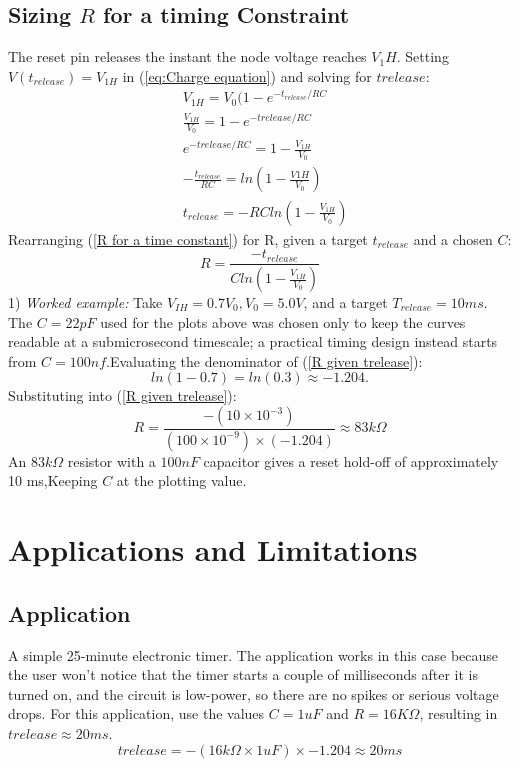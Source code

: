 \documentclass[conference]{IEEEtran}
\begin{document}
\subsection{Sizing $R$ for a timing Constraint}
The reset pin releases the instant the node voltage reaches $V_1H$. Setting $V(t_{release}) = V_{1H}$ in (\ref{eq:Charge equation}) and solving for $t{release}:$
\begin{equation}
    \begin{aligned}
        & V_{1H} = V_0 ( 1 - e^{-t_{release}/RC}\\
        &\frac{V_{1H}}{V_0} = 1 - e^{-trelease/RC}\\
        &e^{-trelease/RC} = 1 - \frac{V_{1H}}{V_0}\\
        &-\frac{t_{release}}{RC} = ln(1 - \frac{V{1H}}{V_0})\\
        &t_{release} = -RC ln(1- \frac{V_{1H}}{V_0})
    \end{aligned}
    \label{R for a time constant}
\end{equation}
Rearranging (\ref{R for a time constant}) for R, given a target $t_{release}$ and a chosen $C$:
\begin{equation}
    R = \frac{-t_{release}}{C ln(1 -\frac{V_{1H}}{V_0})}
    \label{R given trelease}
\end{equation}
1) \textit{Worked example:} Take $V_{IH} = 0.7 V_0, V_0 = 5.0 V$, and a target $T_{release} = 10ms$. The $C = 22 pF$ used for the plots above was chosen only to keep the curves readable at a submicrosecond timescale; a practical timing design instead starts from $C = 100nf$.Evaluating the denominator of (\ref{R given trelease}):
\begin{equation}
    ln(1-0.7) = ln(0.3) \approx -1.204.
\end{equation}
Substituting into (\ref{R given trelease}):
\begin{equation}
    R = \frac{-(10 \times 10^{-3})}{(100 \times 10^{-9}) \times (-1.204)} \approx 83 k\Omega
\end{equation}
An $83k\Omega$ resistor with a $100 nF$ capacitor gives a reset hold-off of approximately 10 ms,Keeping $C$ at the plotting value.
\section{Applications and Limitations}
\subsection{Application}
A simple 25-minute electronic timer. The application works in this case because the user won't notice that the timer starts a couple of milliseconds after it is turned on, and the circuit is low-power, so there are no spikes or serious voltage drops. For this application, use the values $C = 1 uF$ and $R = 16K\Omega$, resulting in $trelease \approx 20ms$.
\begin{equation}
    trelease = -(16k\Omega \times 1 uF) \times -1.204 \approx 20ms
    \label{Trelease for Application}
\end{equation}
\end{document}
